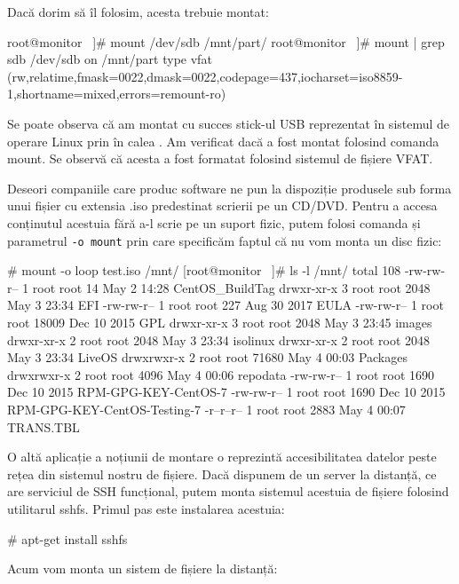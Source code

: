Dacă dorim să îl folosim, acesta trebuie montat:

\begin{screen}
root@monitor ~]#  mount /dev/sdb /mnt/part/
root@monitor ~]#  mount | grep sdb
/dev/sdb on /mnt/part type vfat (rw,relatime,fmask=0022,dmask=0022,codepage=437,iocharset=iso8859-1,shortname=mixed,errors=remount-ro)
\end{screen}

Se poate observa că am montat cu succes stick-ul USB reprezentat în sistemul de
operare Linux prin  în calea . Am verificat dacă
a fost montat folosind comanda mount. Se observă că acesta a fost formatat
folosind sistemul de fișiere VFAT.

Deseori companiile care produc software ne pun la dispoziție produsele sub forma
unui fișier cu extensia .iso predestinat scrierii pe un CD/DVD. Pentru a accesa
conținutul acestuia fără a-l scrie pe un suport fizic, putem folosi comanda
 și parametrul \texttt{-o mount} prin care specificăm faptul că nu
vom monta un disc fizic:

\begin{screen}
# mount -o loop test.iso /mnt/
[root@monitor ~]# ls -l /mnt/
total 108
-rw-rw-r-- 1 root root    14 May  2 14:28 CentOS_BuildTag
drwxr-xr-x 3 root root  2048 May  3 23:34 EFI
-rw-rw-r-- 1 root root   227 Aug 30  2017 EULA
-rw-rw-r-- 1 root root 18009 Dec 10  2015 GPL
drwxr-xr-x 3 root root  2048 May  3 23:45 images
drwxr-xr-x 2 root root  2048 May  3 23:34 isolinux
drwxr-xr-x 2 root root  2048 May  3 23:34 LiveOS
drwxrwxr-x 2 root root 71680 May  4 00:03 Packages
drwxrwxr-x 2 root root  4096 May  4 00:06 repodata
-rw-rw-r-- 1 root root  1690 Dec 10  2015 RPM-GPG-KEY-CentOS-7
-rw-rw-r-- 1 root root  1690 Dec 10  2015 RPM-GPG-KEY-CentOS-Testing-7
-r--r--r-- 1 root root  2883 May  4 00:07 TRANS.TBL
\end{screen}

O altă aplicație a noțiunii de montare o reprezintă accesibilitatea datelor
peste rețea din sistemul nostru de fișiere. Dacă dispunem de un server la
distanță, ce are serviciul de SSH funcțional, putem monta sistemul acestuia de
fișiere folosind utilitarul sshfs. Primul pas este instalarea acestuia:

\begin{screen}
# apt-get install sshfs
\end{screen}

Acum vom monta un sistem de fișiere la distanță:

